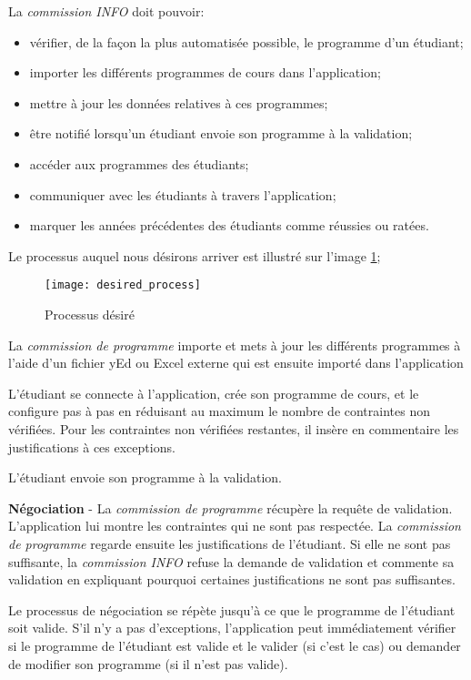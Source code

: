 La \textit{commission INFO} doit pouvoir:
\begin{itemize}
\item vérifier, de la façon la plus automatisée possible, le programme d'un étudiant;
\item importer les différents programmes de cours dans l'application;
\item mettre à jour les données relatives à ces programmes;
\item être notifié lorsqu'un étudiant envoie son programme à la validation;
\item accéder aux programmes des étudiants;
\item communiquer avec les étudiants à travers l'application;
\item marquer les années précédentes des étudiants comme réussies ou ratées.
\end{itemize}

Le processus auquel nous désirons arriver est illustré sur l'image \ref{fig:desired_process};

\begin{figure}
\centering
\caption{Processus désiré}
\label{fig:desired_process}
\texttt{[image: desired\_process]}
\end{figure}


La \textit{commission de programme} importe et mets à jour les différents programmes à l'aide d'un fichier yEd ou Excel externe qui est ensuite importé dans l'application

L'étudiant se connecte à l'application, crée son programme de cours, et le configure pas à pas en réduisant au maximum le nombre de contraintes non vérifiées. Pour les contraintes non vérifiées restantes, il insère en commentaire les justifications à ces exceptions. 

L'étudiant envoie son programme à la validation. 

\textbf{Négociation} - La \textit{commission de programme} récupère la requête de validation. L'application lui montre les contraintes qui ne sont pas respectée. La \textit{commission de programme} regarde ensuite les justifications de l'étudiant. Si elle ne sont pas suffisante, la \textit{commission INFO} refuse la demande de validation et commente sa validation en expliquant pourquoi certaines justifications ne sont pas suffisantes. 

Le processus de négociation se répète jusqu'à ce que le programme de l'étudiant soit valide. S'il n'y a pas d'exceptions, l'application peut immédiatement vérifier si le programme de l'étudiant est valide et le valider (si c'est le cas) ou demander de modifier son programme (si il n'est pas valide).





